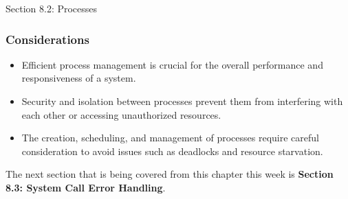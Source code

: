 \begin{notes}{Section 8.2: Processes}
    \subsubsection*{Considerations}
    
    \begin{itemize}
        \item Efficient process management is crucial for the overall performance and responsiveness of a system.
        \item Security and isolation between processes prevent them from interfering with each other or accessing unauthorized resources.
        \item The creation, scheduling, and management of processes require careful consideration to avoid issues such as deadlocks and resource starvation.
    \end{itemize}    
\end{notes}

The next section that is being covered from this chapter this week is \textbf{Section 8.3: System Call Error Handling}.

